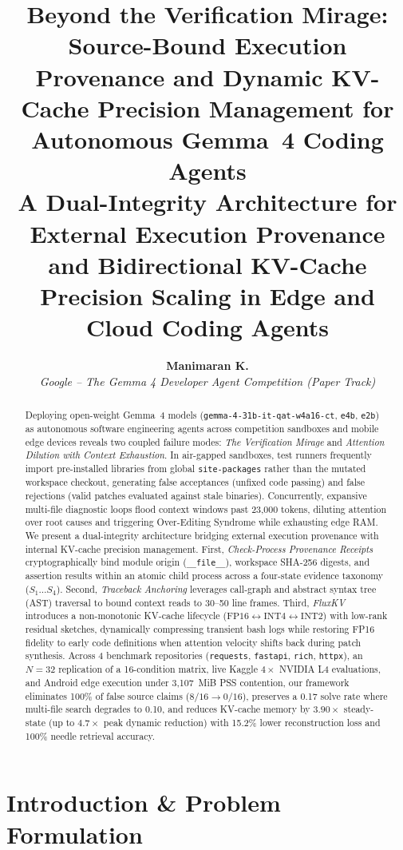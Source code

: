 \documentclass[10pt,twocolumn]{article}
\title{\textbf{\Large Beyond the Verification Mirage: Source-Bound Execution Provenance and Dynamic KV-Cache Precision Management for Autonomous Gemma~4 Coding Agents}\\[0.8ex]
\large A Dual-Integrity Architecture for External Execution Provenance and Bidirectional KV-Cache Precision Scaling in Edge and Cloud Coding Agents}
\author{\textbf{Manimaran K.}\\
\textit{Google -- The Gemma 4 Developer Agent Competition (Paper Track)}}
\date{}
\begin{document}
\maketitle

\begin{abstract}
Deploying open-weight Gemma~4 models (\texttt{gemma-4-31b-it-qat-w4a16-ct}, \texttt{e4b}, \texttt{e2b}) as autonomous software engineering agents across competition sandboxes and mobile edge devices reveals two coupled failure modes: \textit{The Verification Mirage} and \textit{Attention Dilution with Context Exhaustion}. In air-gapped sandboxes, test runners frequently import pre-installed libraries from global \texttt{site-packages} rather than the mutated workspace checkout, generating false acceptances (unfixed code passing) and false rejections (valid patches evaluated against stale binaries). Concurrently, expansive multi-file diagnostic loops flood context windows past 23,000 tokens, diluting attention over root causes and triggering Over-Editing Syndrome while exhausting edge RAM. We present a dual-integrity architecture bridging external execution provenance with internal KV-cache precision management. First, \textit{Check-Process Provenance Receipts} cryptographically bind module origin (\texttt{\_\_file\_\_}), workspace SHA-256 digests, and assertion results within an atomic child process across a four-state evidence taxonomy ($S_1 \dots S_4$). Second, \textit{Traceback Anchoring} leverages call-graph and abstract syntax tree (AST) traversal to bound context reads to 30--50 line frames. Third, \textit{FluxKV} introduces a non-monotonic KV-cache lifecycle ($\text{FP16} \leftrightarrow \text{INT4} \leftrightarrow \text{INT2}$) with low-rank residual sketches, dynamically compressing transient bash logs while restoring FP16 fidelity to early code definitions when attention velocity shifts back during patch synthesis. Across 4 benchmark repositories (\texttt{requests}, \texttt{fastapi}, \texttt{rich}, \texttt{httpx}), an $N=32$ replication of a 16-condition matrix, live Kaggle $4\times$ NVIDIA L4 evaluations, and Android edge execution under 3,107~MiB PSS contention, our framework eliminates 100\% of false source claims ($8/16 \to 0/16$), preserves a 0.17 solve rate where multi-file search degrades to 0.10, and reduces KV-cache memory by $3.90\times$ steady-state (up to $4.7\times$ peak dynamic reduction) with 15.2\% lower reconstruction loss and 100\% needle retrieval accuracy.
\end{abstract}

\section{Introduction \& Problem Formulation}
\end{document}
